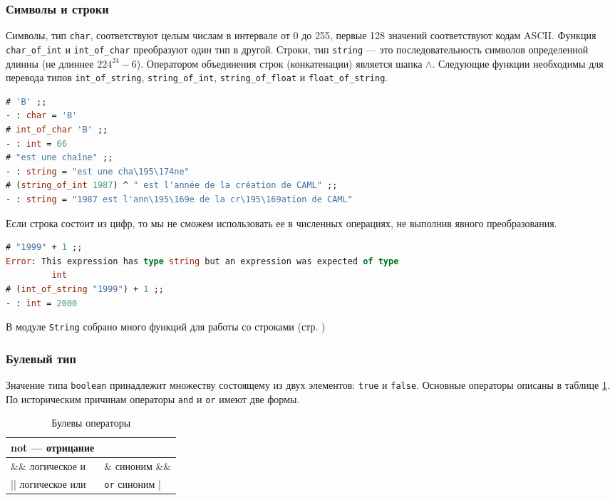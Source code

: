 \subsubsection{Символы и строки}

Символы, тип \texttt{char}, соответствуют целым числам в интервале от 0 до 255,
первые 128 значений соответствуют кодам ASCII. Функция \texttt{char\_of\_int} и
\texttt{int\_of\_char} преобразуют один тип в другой. Строки, тип
\texttt{string} --- это последовательность символов определенной длинны (не
длиннее $224^{24} - 6$). Оператором объединения строк (конкатенации) является
шапка $\wedge$. Следующие функции необходимы для перевода типов
\texttt{int\_of\_string}, \texttt{string\_of\_int}, \texttt{string\_of\_float} и
\texttt{float\_of\_string}.

\begin{lstlisting}[language=OCaml]
# 'B' ;;
- : char = 'B'
# int_of_char 'B' ;;
- : int = 66
# "est une chaîne" ;;
- : string = "est une cha\195\174ne"
# (string_of_int 1987) ^ " est l'année de la création de CAML" ;;
- : string = "1987 est l'ann\195\169e de la cr\195\169ation de CAML"
\end{lstlisting}

Если строка состоит из цифр, то мы не сможем использовать ее в численных
операциях, не выполнив явного преобразования.

\begin{lstlisting}[language=OCaml]
# "1999" + 1 ;;
Error: This expression has type string but an expression was expected of type
         int
# (int_of_string "1999") + 1 ;;
- : int = 2000
\end{lstlisting}

В модуле \texttt{String} собрано много функций для работы со строками (стр.
\pageref{??})

\subsubsection{Булевый тип}

Значение типа \texttt{boolean} принадлежит множеству состоящему из двух
элементов: \texttt{true} и \texttt{false}. Основные операторы описаны в таблице
\ref{tbl:boolean_operations}. По историческим причинам операторы \texttt{and} и
\texttt{or} имеют две формы.

\begin{table}[hl]
	\label{tbl:boolean_operations}
\begin{center}
	\caption{Булевы операторы}
	\begin{tabular}{|p{5cm}|p{5cm}|}
	\hline
	not --- отрицание & \\
	\hline
	\&\& логическое и & \& синоним \&\& \\
	\hline
	|| логическое или & \texttt{or} синоним | \\
	\hline
	\end{tabular}
\end{center}
\end{table}

